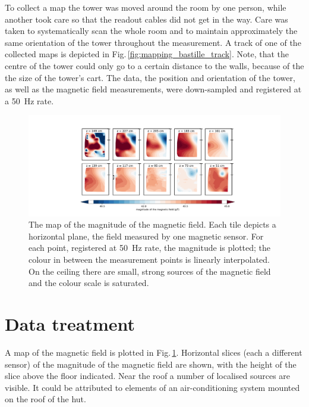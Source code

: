 To collect a map the tower was moved around the room by one person, while another took care so that the readout cables did not get in the way.
Care was taken to systematically scan the whole room and to maintain approximately the same orientation of the tower throughout the measurement. A track of one of the collected maps is depicted in Fig.\,\ref{fig:mapping_bastille_track}. Note, that the centre of the tower could only go to a certain distance to the walls, because of the the size of the tower's cart.
The data, the position and orientation of the tower, as well as the magnetic field measurements, were down-sampled and registered at a \SI{50}{\hertz} rate.

\begin{figure}
  \centering
  \includegraphics[width=\linewidth]{gfx/mapping/lpsc/bastille_crane_away_rep_magnitude_low_range_crop.pdf}
  \caption{The map of the magnitude of the magnetic field. Each tile depicts a horizontal plane, the field measured by one magnetic sensor. For each point, registered at \SI{50}{\hertz} rate, the magnitude is plotted; the colour in between the measurement points is linearly interpolated. On the ceiling there are small, strong sources of the magnetic field and the colour scale is saturated.}\label{fig:mapping_bastille_magnitude}
\end{figure}




\section{Data treatment}
\label{sec:mapping_lpsc_data_treatment}
A map of the magnetic field is plotted in Fig.\,\ref{fig:mapping_bastille_magnitude}. Horizontal slices (each a different sensor) of the magnitude of the magnetic field are shown, with the height of the slice above the floor indicated. Near the roof a number of localised sources are visible. It could be attributed to elements of an air-conditioning system mounted on the roof of the hut.

